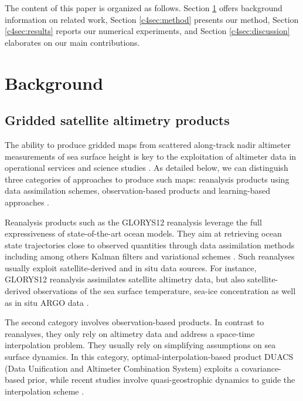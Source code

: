 \begin{bibunit}
    
The content of this paper is organized as follows. Section \ref{c4sec:background} offers background information on related work, Section \ref{c4sec:method} presents our method, Section \ref{c4sec:results} reports our numerical experiments, and Section \ref{c4sec:discussion} elaborates on our main contributions.




\section{Background}
\label{c4sec:background}
\subsection{Gridded satellite altimetry products}
\label{c4ssec:interpolation}
The ability to produce gridded maps from scattered along-track nadir altimeter measurements of sea surface height is key to the exploitation of altimeter data in operational services and science studies \cite{abdallaAltimetryFutureBuilding2021}.
As detailed below, we can distinguish three categories of approaches to produce such maps: reanalysis products \cite{jean-michelCopernicusGlobal122021} using data assimilation schemes, observation-based products \cite{taburetDUACSDT2018252019} and learning-based approaches \cite{fabletENDTOENDPHYSICSINFORMEDREPRESENTATION2021}.

Reanalysis products such as the GLORYS12 reanalysis \cite{jean-michelCopernicusGlobal122021} leverage the full expressiveness of state-of-the-art ocean models. They aim at retrieving ocean state trajectories close to observed quantities through data assimilation methods including among others Kalman filters and variational schemes \cite{carrassiDataAssimilationGeosciences2018}. Such reanalyses usually exploit satellite-derived and in situ data sources. For instance, GLORYS12 reanalysis assimilates satellite altimetry data, but also satellite-derived observations of the sea surface temperature, sea-ice concentration as well as in situ ARGO data  \cite{wongArgoData19992020}.


The second category involves observation-based products. In contrast to reanalyses, they only rely on altimetry data and address a space-time interpolation problem. They usually rely on simplifying assumptions on sea surface dynamics. In this category, optimal-interpolation-based product DUACS (Data Unification and Altimeter Combination System) \cite{taburetDUACSDT2018252019} exploits a covariance-based prior, while recent studies involve quasi-geostrophic dynamics to guide the interpolation scheme \cite{guillouMappingAltimetryForthcoming2021,ballarottaDynamicMappingAlongTrack2020}.


\end{bibunit}
